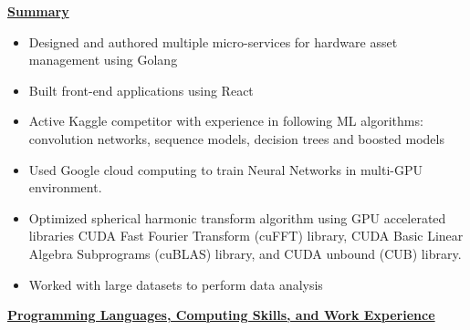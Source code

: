 \documentclass[11pt]{ltxdoc}
\begin{document}
\vskip 18pt

\begin{center}
	\textbf{\underline{Summary}}
\end{center}

\begin{itemize}
	\item Designed and authored multiple micro-services for hardware asset management using Golang
	\item Built front-end applications using React
	\item Active Kaggle competitor with experience in following ML algorithms: convolution networks, sequence models, decision trees and boosted models
	\item Used Google cloud computing to train Neural Networks in multi-GPU
environment.
	\item Optimized spherical harmonic transform algorithm using GPU accelerated libraries CUDA Fast Fourier Transform (cuFFT) library,
CUDA Basic Linear Algebra Subprograms (cuBLAS) library, and
CUDA unbound (CUB) library.
	\item Worked with large datasets to perform data analysis

\end{itemize}

\vskip 18pt

\begin{center}
	\textbf{\underline{Programming Languages, Computing Skills, and Work Experience}}
\end{center}

\end{document}
